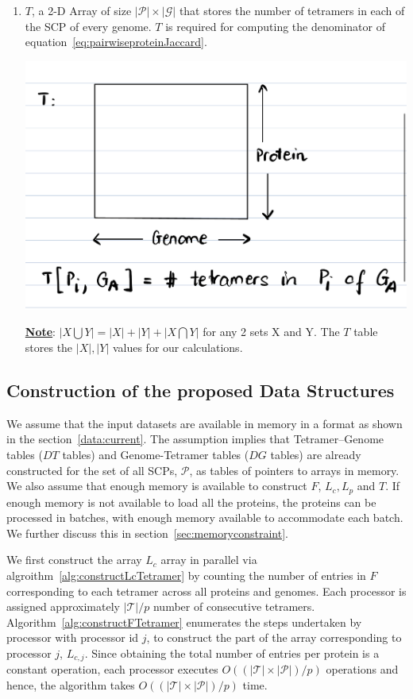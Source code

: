 \documentclass{article}[11pt]
\begin{document}
\begin{enumerate}
    
    \item $T$, a 2-D Array of size $|\mathcal{P}|\times|\mathcal{G}|$ that stores the number of tetramers in each of the SCP of every genome. 
    $T$ is required for computing the denominator of equation~\ref{eq:pairwiseproteinJaccard}.
    
    \includegraphics[width=\textwidth]{figures/T_table.jpeg}
    
    \underline{\textbf{Note}}: $|X \bigcup Y| = |X| + |Y| + |X \bigcap Y|$ for any 2 sets X and Y. The $T$ table stores the $|X|, |Y|$ values for our calculations. 
\end{enumerate}

\subsection{Construction of the proposed Data Structures}
We assume that the input datasets are available in memory in a format as shown in the section~\ref{data:current}.
The assumption implies that Tetramer--Genome tables ($DT$ tables) and Genome-Tetramer tables ($DG$ tables) are already constructed for the set of all SCPs, $\mathcal{P}$, as tables of pointers to arrays in memory. 
We also assume that enough memory is available to construct $F$, $L_c, L_p$ and $T$. 
If enough memory is not available to load all the proteins, the proteins can be processed in batches, with enough memory available to accommodate each batch. 
We further discuss this in section~\ref{sec:memoryconstraint}. 


We first construct the array $L_c$ array in parallel via algroithm~\ref{alg:constructLcTetramer} by counting the number of entries in $F$ corresponding to each tetramer across all proteins and genomes.
Each processor is assigned approximately $|\mathcal{T}|/p$ number of consecutive tetramers.
Algorithm~\ref{alg:constructFTetramer} enumerates the steps undertaken by processor with processor id $j$, to construct the part of the array corresponding to processor $j$, $L_{c,j}$. 
Since obtaining the total number of entries per protein is a constant operation, each processor executes $O((|\mathcal{T}| \times |\mathcal{P}|)/p)$ operations and hence, the algorithm takes $O((|\mathcal{T}| \times |\mathcal{P}|)/p)$ time. 
\end{document}
